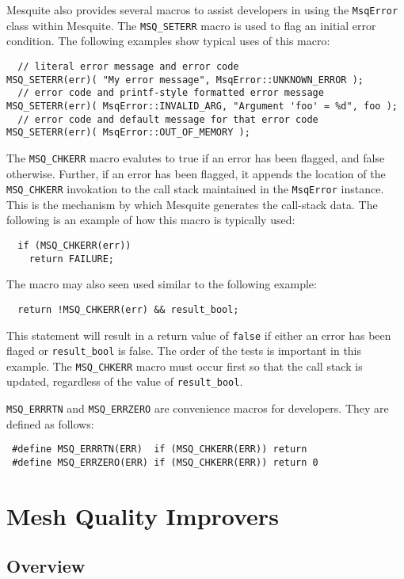 \documentclass{article}
\begin{document}
Mesquite also provides several macros to assist developers in using the \texttt{MsqError} class within Mesquite.  The \texttt{MSQ\_SETERR} macro is used to flag an initial error condition.  The following examples show typical uses of this macro:
\begin{lstlisting}
  // literal error message and error code
MSQ_SETERR(err)( "My error message", MsqError::UNKNOWN_ERROR );
  // error code and printf-style formatted error message
MSQ_SETERR(err)( MsqError::INVALID_ARG, "Argument 'foo' = %d", foo );
  // error code and default message for that error code
MSQ_SETERR(err)( MsqError::OUT_OF_MEMORY );
\end{lstlisting}

The \texttt{MSQ\_CHKERR} macro evalutes to true if an error has been flagged, and false otherwise.  Further, if an error has been flagged, it appends the location of the \texttt{MSQ\_CHKERR} invokation to the call stack maintained in the \texttt{MsqError} instance.  This is the mechanism by which Mesquite generates the call-stack data.  The following is an example of how this macro is typically used:
\begin{lstlisting}
  if (MSQ_CHKERR(err))
    return FAILURE;
\end{lstlisting}
The macro may also seen used similar to the following example:
\begin{lstlisting}
  return !MSQ_CHKERR(err) && result_bool;
\end{lstlisting}
This statement will result in a return value of \texttt{false} if either an error has been flaged or \texttt{result\_bool} is false.  The order of the tests is important in this example.  The \texttt{MSQ\_CHKERR} macro must occur first so that the call stack is updated, regardless of the value of \texttt{result\_bool}.

\texttt{MSQ\_ERRRTN} and \texttt{MSQ\_ERRZERO}  are convenience macros for developers. They are defined as follows:
\begin{lstlisting}
 #define MSQ_ERRRTN(ERR)  if (MSQ_CHKERR(ERR)) return
 #define MSQ_ERRZERO(ERR) if (MSQ_CHKERR(ERR)) return 0
\end{lstlisting}

\section{Mesh Quality Improvers}

\subsection{Overview}
\end{document}
